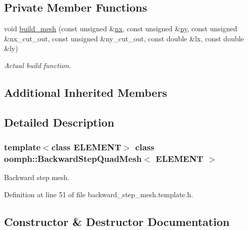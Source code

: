 \subsection*{Private Member Functions}
\begin{DoxyCompactItemize}
\item 
void \hyperlink{classoomph_1_1BackwardStepQuadMesh_ab71a6f2854d36b845ed79dccb0101991}{build\+\_\+mesh} (const unsigned \&\hyperlink{classoomph_1_1RectangularQuadMesh_abfef93d6322886cdce14a437186e4821}{nx}, const unsigned \&\hyperlink{classoomph_1_1RectangularQuadMesh_a86d76a55eb7c4e8bca9b74d23c8b0412}{ny}, const unsigned \&nx\+\_\+cut\+\_\+out, const unsigned \&ny\+\_\+cut\+\_\+out, const double \&lx, const double \&ly)
\begin{DoxyCompactList}\small\item\em Actual build function. \end{DoxyCompactList}\end{DoxyCompactItemize}
\subsection*{Additional Inherited Members}


\subsection{Detailed Description}
\subsubsection*{template$<$class E\+L\+E\+M\+E\+NT$>$\newline
class oomph\+::\+Backward\+Step\+Quad\+Mesh$<$ E\+L\+E\+M\+E\+N\+T $>$}

Backward step mesh. 

Definition at line 51 of file backward\+\_\+step\+\_\+mesh.\+template.\+h.



\subsection{Constructor \& Destructor Documentation}
\mbox{\label{classoomph_1_1BackwardStepQuadMesh_ae8374ae7d3646c00fec4fc9c2d604cf8}} 
